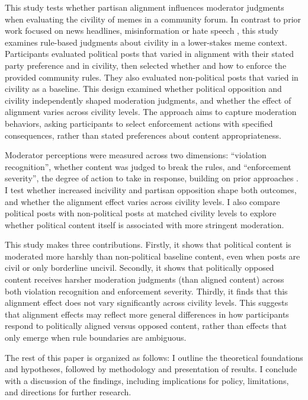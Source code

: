 \documentclass[12pt]{article}
\begin{document}
This study tests whether partisan alignment influences moderator judgments when evaluating the civility of memes in a community forum. In contrast to prior work focused on news headlines, misinformation or hate speech \parencite{appelPartisanConflictContent2023a,kozyrevaResolvingContentModeration2023,solomonIllusoryInterpartyDisagreement2024}, this study examines rule-based judgments about civility in a lower-stakes meme context. Participants evaluated political posts that varied in alignment with their stated party preference and in civility, then selected whether and how to enforce the provided community rules. They also evaluated non-political posts that varied in civility as a baseline. This design examined whether political opposition and civility independently shaped moderation judgments, and whether the effect of alignment varies across civility levels. The approach aims to capture moderation behaviors, asking participants to select enforcement actions with specified consequences, rather than stated preferences about content appropriateness.

Moderator perceptions were measured across two dimensions: \enquote{violation recognition}, whether content was judged to break the rules, and \enquote{enforcement severity}, the degree of action to take in response, building on prior approaches \parencite{kozyrevaResolvingContentModeration2023,solomonIllusoryInterpartyDisagreement2024}. I test whether increased incivility and partisan opposition shape both outcomes, and whether the alignment effect varies across civility levels. I also compare political posts with non-political posts at matched civility levels to explore whether political content itself is associated with more stringent moderation.

This study makes three contributions. Firstly, it shows that political content is moderated more harshly than non-political baseline content, even when posts are civil or only borderline uncivil. Secondly, it shows that politically opposed content receives harsher moderation judgments (than aligned content) across both violation recognition and enforcement severity. Thirdly, it finds that this alignment effect does not vary significantly across civility levels. This suggests that alignment effects may reflect more general differences in how participants respond to politically aligned versus opposed content, rather than effects that only emerge when rule boundaries are ambiguous.

The rest of this paper is organized as follows: I outline the theoretical foundations and hypotheses, followed by methodology and presentation of results. I conclude with a discussion of the findings, including implications for policy, limitations, and directions for further research.
\end{document}
